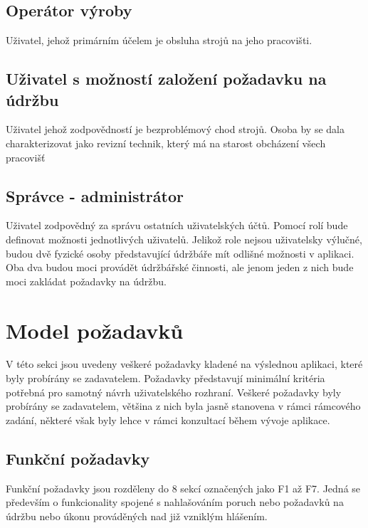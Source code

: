 \documentclass[thesis=M,czech]{FITthesis}[2012/06/26]
\begin{document}
\subsection{Operátor výroby}
Uživatel, jehož primárním účelem je obsluha strojů na jeho pracovišti. 

\subsection{Uživatel s možností založení požadavku na údržbu}
Uživatel jehož zodpovědností je bezproblémový chod strojů. Osoba by se dala charakterizovat jako revizní technik, který má na starost obcházení všech pracovišť 
\subsection{Správce - administrátor}
Uživatel zodpovědný za správu ostatních uživatelských účtů. Pomocí rolí bude definovat možnosti jednotlivých uživatelů. Jelikož role nejsou uživatelsky výlučné, budou dvě fyzické osoby představující údržbáře mít odlišné možnosti v aplikaci. Oba dva budou moci provádět údržbářské činnosti, ale jenom jeden z nich bude moci zakládat požadavky na údržbu.


\section{Model požadavků}
V této sekci jsou uvedeny veškeré požadavky kladené na výslednou aplikaci, které byly probírány se zadavatelem. Požadavky představují minimální kritéria potřebná pro samotný návrh uživatelského rozhraní. Veškeré požadavky byly probírány se zadavatelem, většina z nich byla jasně stanovena v rámci rámcového zadání, některé však byly lehce v rámci konzultací během vývoje aplikace.

\subsection{Funkční požadavky}
Funkční požadavky jsou rozděleny do 8 sekcí označených jako F1 až F7. Jedná se především o funkcionality spojené s nahlašováním poruch nebo požadavků na údržbu nebo úkonu prováděných nad již vzniklým hlášením. 
\end{document}
